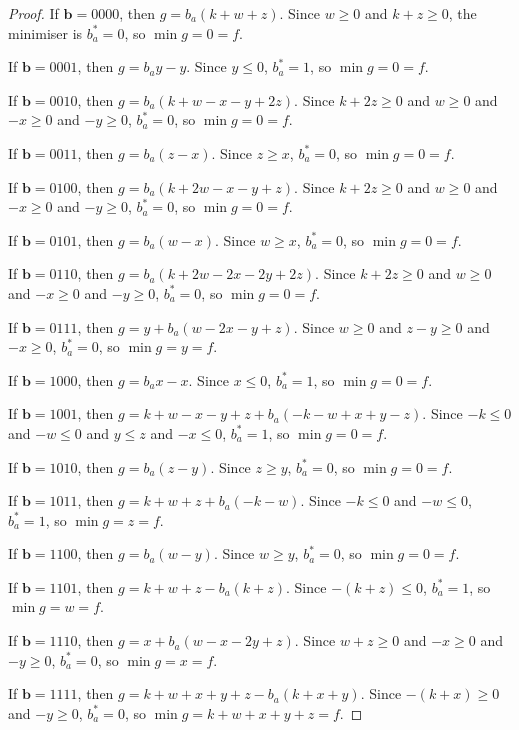 \documentclass[11pt]{scrartcl}
\newcommand{\vc}[1]{\boldsymbol{#1}}
\begin{document}
\begin{proof}
If $\vc b = 0000$, then $g = b_a(k + w + z)$. Since $w \ge 0$ and $k + z \ge 0$, the minimiser is $b_a^*= 0$, so $\min g = 0 = f$.

If $\vc b = 0001$, then $g = b_ay - y$. Since $y \le 0$, $b_a^*= 1$, so $\min g = 0 = f$.

If $\vc b = 0010$, then $g = b_a(k + w - x - y + 2z)$. Since $k + 2z \ge 0$ and $ w \ge 0 $ and $- x\ge 0$ and $-y \ge 0$, $b_a^*= 0$, so $\min g = 0 = f$.

If $\vc b = 0011$, then $g = b_a(z - x)$. Since $z \ge x$, $b_a^*= 0$, so $\min g = 0 = f$.

If $\vc b = 0100$, then $g = b_a(k + 2w - x - y + z)$. Since $k +2z \ge 0$ and $w \ge 0$ and $-x \ge 0 $ and $-y \ge 0$, $b_a^*= 0$, so $\min g = 0 = f$.

If $\vc b = 0101$, then $g = b_a(w - x)$. Since $w \ge x$, $b_a^*= 0$, so $\min g = 0 = f$.

If $\vc b = 0110$, then $g = b_a(k + 2w - 2x - 2y + 2z)$. Since $k + 2z \ge 0$ and $w \ge 0$ and $-x \ge 0$ and $-y \ge 0$, $b_a^*= 0$, so $\min g = 0 = f$.

If $\vc b = 0111$, then $g = y + b_a(w - 2x - y + z)$. Since $w \ge 0$ and $z - y \ge 0$ and $-x \ge 0$, $b_a^*= 0$, so $\min g = y = f$.

If $\vc b = 1000$, then $g = b_ax - x$. Since $x \le 0$, $b_a^*= 1$, so $\min g = 0 = f$.

If $\vc b = 1001$, then $g = k + w - x - y + z +b_a(-k - w + x + y - z)$. Since $-k \le 0 $ and $-w \le 0 $ and $y \le z$ and $-x \le 0$, $b_a^*= 1$, so $\min g = 0 = f$.

If $\vc b = 1010$, then $g = b_a(z - y)$. Since $ z \ge y$, $b_a^*= 0$, so $\min g = 0 = f$.

If $\vc b = 1011$, then $g = k + w + z + b_a(-k - w)$. Since $- k \le 0$ and $-w \le 0$, $b_a^*= 1$, so $\min g = z = f$.

If $\vc b = 1100$, then $g = b_a(w - y)$. Since $w \ge y$, $b_a^*= 0$, so $\min g = 0 = f$.

If $\vc b = 1101$, then $g = k + w + z - b_a(k + z)$. Since $-(k + z) \le 0$, $b_a^*= 1$, so $\min g = w = f$.

If $\vc b = 1110$, then $g = x + b_a(w - x - 2y + z)$. Since $w + z \ge 0$ and $-x \ge 0$ and $-y \ge 0$, $b_a^* = 0$, so $\min g = x = f$.

If $\vc b = 1111$, then $g = k + w + x + y + z - b_a(k + x + y)$. Since $-(k + x) \ge 0$ and $-y \ge 0$, $b_a^*= 0$, so $\min g = k+w+x+y+z = f$.

\end{proof}
\end{document}
